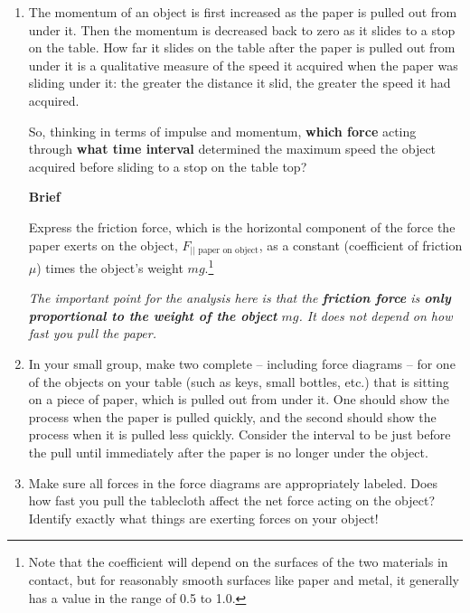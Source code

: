 \begin{enumerate}
	\item The momentum of an object is first increased as the paper is pulled out from under it. Then the momentum is decreased back to zero as it slides to a stop on the table. How far it slides on the table after the paper is pulled out from under it is a qualitative measure of the speed it acquired when the paper was sliding under it: the greater the distance it slid, the greater the speed it had acquired.
	
	So, thinking in terms of impulse and momentum, \textbf{which force} acting through \textbf{what time interval} determined the maximum speed the object acquired before sliding to a stop on the table top?

\vspace{8pt}
\hspace{-\textwidth}\hspace{\linewidth} \textbf{Brief}
\hspace{\textwidth}\hspace{-\linewidth}
\WCD

	Express the friction force, which is the horizontal component of the force the paper exerts on the object, $F_{||\text{ paper on object}}$, as a constant (coefficient of friction $\mu$) times the object's weight $mg$.\footnote{Note that the coefficient will depend on the surfaces of the two materials in contact, but for reasonably smooth surfaces like paper and metal, it generally has a value in the range of 0.5 to 1.0.}
	
	\emph{The important point for the analysis here is that the \textbf{friction force} is \textbf{only proportional to the weight of the object} \boldmath$mg$. It does \emph{not} depend on how fast you pull the paper.}
	
	\item In your small group, make two complete \pcharts{} -- including force diagrams -- for one of the objects on your table (such as keys, small bottles, etc.) that is sitting on a piece of paper, which is pulled out from under it. One \pchart{} should show the process when the paper is pulled quickly, and the second \pchart{} should show the process when it is pulled less quickly. Consider the interval to be just before the pull until immediately after the paper is no longer under the object.
	
	\item Make sure all forces in the force diagrams are appropriately labeled. Does how fast you pull the tablecloth affect the net force acting on the object? Identify exactly what things are exerting forces on your object!
	

\end{enumerate}
